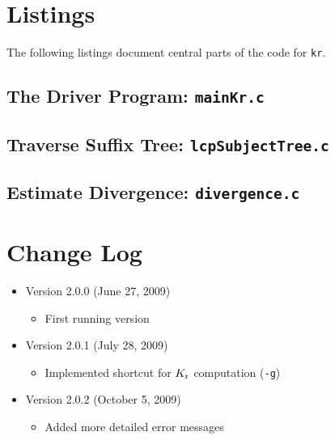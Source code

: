 \documentclass{article}
\newcommand{\bi}{\begin{itemize}}
\newcommand{\ei}{\end{itemize}}
\newcommand{\I}{\item}
\newcommand{\ty}{\texttt}
\newcommand{\kr}{K_{\rm r}}
\begin{document}
\section{Listings}
\lstset{language=c}
The following listings document central parts of the code for \ty{kr}.
\subsection{The Driver Program: \ty{mainKr.c}}

\subsection{Traverse Suffix Tree: \ty{lcpSubjectTree.c}}

\subsection{Estimate Divergence: \ty{divergence.c}}


\section{Change Log}
\bi
\I Version 2.0.0 (June 27, 2009)
\bi
\I First running version
\ei
\I Version 2.0.1 (July 28, 2009)
\bi
\I Implemented shortcut for $\kr$ computation (\ty{-g})
\ei
\I Version 2.0.2 (October 5, 2009)
\bi
\I Added more detailed error messages
\ei
\ei



\end{document}
